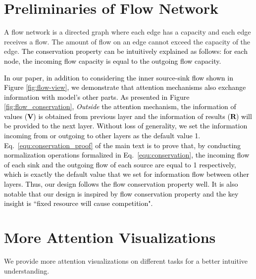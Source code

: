 \documentclass[nohyperref]{article}
\theoremstyle{plain}
\theoremstyle{definition}
\theoremstyle{remark}
\newcommand{\update}[1]{{\textcolor{black}{#1}}}
\begin{document}
\section{Preliminaries of Flow Network}

A flow network \cite{Ahuja1993NetworkF} is a directed graph where each edge has a capacity and each edge receives a flow. The amount of flow on an edge cannot exceed the capacity of the edge. \update{The conservation property can be intuitively explained as follows: for each node, the incoming flow capacity is equal to the outgoing flow capacity.}

\update{In our paper, in addition to considering the inner source-sink flow shown in Figure \ref{fig:flow-view}, we demonstrate that attention mechanisms also exchange information with model's other parts. As presented in Figure \ref{fig:flow_conservation}, \emph{Outside} the attention mechanism, the information of values ($\mathbf{V}$) is obtained from previous layer and the information of results ($\mathbf{R}$) will be provided to the next layer. Without loss of generality, we set the information incoming from or outgoing to other layers as the default value 1. Eq.~\eqref{equ:conservation_proof} of the main text is to prove that, by conducting normalization operations formalized in Eq.~\eqref{equ:conservation}, the incoming flow of each sink and the outgoing flow of each source are equal to 1 respectively, which is exactly the default value that we set for information flow between other layers. Thus, our design follows the flow conservation property well. It is also notable that our design is inspired by flow conservation property and the key insight is ``fixed resource will cause competition".}

\section{More Attention Visualizations}

We provide more attention visualizations on different tasks for a better intuitive understanding.
\end{document}

